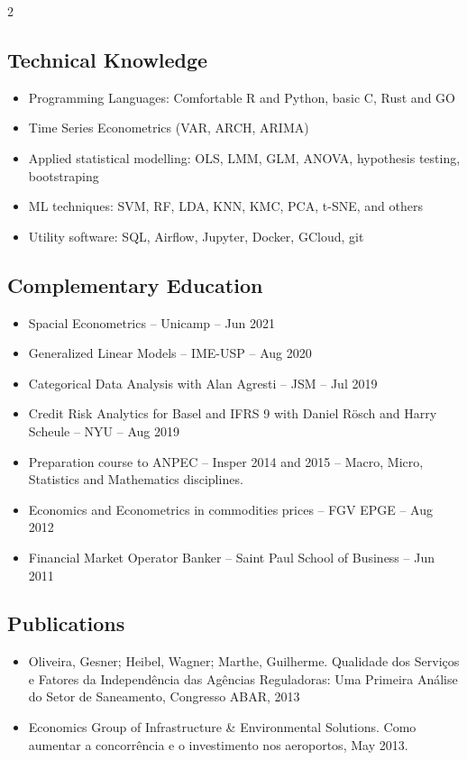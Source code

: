 \documentclass{article}
\begin{document}
\begin{itemize}
\begin{multicols}{2}
\subsection{Technical Knowledge}
\begin{itemize}
\item{Programming Languages: Comfortable R and Python, basic C, Rust and GO}
\item{Time Series Econometrics (VAR, ARCH, ARIMA)}
\item{Applied statistical modelling: OLS, LMM, GLM, ANOVA, hypothesis testing, bootstraping}
\item{ML techniques: SVM, RF, LDA, KNN, KMC, PCA, t-SNE, and others}
\item{Utility software: SQL, Airflow, Jupyter, Docker, GCloud, git}
\end{itemize}

\subsection{Complementary Education}
\begin{itemize}
\item{Spacial Econometrics – Unicamp – Jun 2021}
\item{Generalized Linear Models – IME-USP – Aug 2020}
\item{Categorical Data Analysis with Alan Agresti – JSM – Jul 2019}
\item{Credit Risk Analytics for Basel and IFRS 9 with Daniel Rösch and Harry Scheule – NYU – Aug 2019}
\item{Preparation course to ANPEC – Insper 2014 and 2015 – Macro, Micro, Statistics and Mathematics disciplines.}
\item{Economics and Econometrics in commodities prices – FGV EPGE – Aug 2012}
\item{Financial Market Operator Banker – Saint Paul School of Business – Jun 2011}
\end{itemize}

\columnbreak

\subsection{Publications}
\begin{itemize}
\item{Oliveira, Gesner; Heibel, Wagner; Marthe, Guilherme. Qualidade dos Serviços e Fatores da Independência das Agências Reguladoras: Uma Primeira Análise do Setor de Saneamento, Congresso ABAR, 2013} 
\item{Economics Group of Infrastructure \& Environmental Solutions. Como aumentar a concorrência e o investimento nos aeroportos, May 2013.}
\end{itemize} 


\end{multicols}
\end{itemize}
\end{document}
